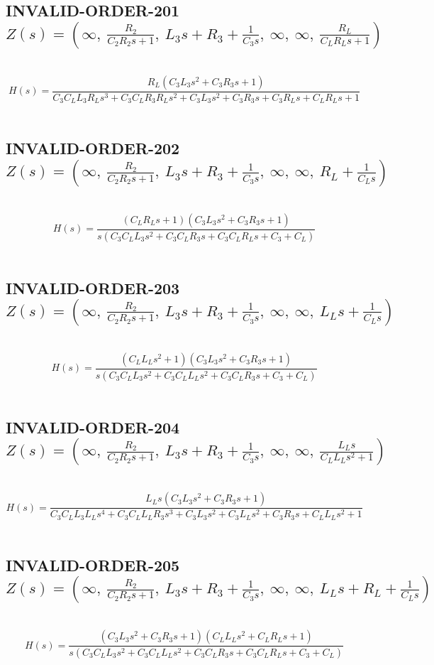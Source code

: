\documentclass{article}
\begin{document}
\subsection{INVALID-ORDER-201 $Z(s) = \left( \infty, \  \frac{R_{2}}{C_{2} R_{2} s + 1}, \  L_{3} s + R_{3} + \frac{1}{C_{3} s}, \  \infty, \  \infty, \  \frac{R_{L}}{C_{L} R_{L} s + 1}\right)$ } \ 
\textbf{\[H(s) = \frac{R_{L} \left(C_{3} L_{3} s^{2} + C_{3} R_{3} s + 1\right)}{C_{3} C_{L} L_{3} R_{L} s^{3} + C_{3} C_{L} R_{3} R_{L} s^{2} + C_{3} L_{3} s^{2} + C_{3} R_{3} s + C_{3} R_{L} s + C_{L} R_{L} s + 1}\] } \ 
\subsection{INVALID-ORDER-202 $Z(s) = \left( \infty, \  \frac{R_{2}}{C_{2} R_{2} s + 1}, \  L_{3} s + R_{3} + \frac{1}{C_{3} s}, \  \infty, \  \infty, \  R_{L} + \frac{1}{C_{L} s}\right)$ } \ 
\textbf{\[H(s) = \frac{\left(C_{L} R_{L} s + 1\right) \left(C_{3} L_{3} s^{2} + C_{3} R_{3} s + 1\right)}{s \left(C_{3} C_{L} L_{3} s^{2} + C_{3} C_{L} R_{3} s + C_{3} C_{L} R_{L} s + C_{3} + C_{L}\right)}\] } \ 
\subsection{INVALID-ORDER-203 $Z(s) = \left( \infty, \  \frac{R_{2}}{C_{2} R_{2} s + 1}, \  L_{3} s + R_{3} + \frac{1}{C_{3} s}, \  \infty, \  \infty, \  L_{L} s + \frac{1}{C_{L} s}\right)$ } \ 
\textbf{\[H(s) = \frac{\left(C_{L} L_{L} s^{2} + 1\right) \left(C_{3} L_{3} s^{2} + C_{3} R_{3} s + 1\right)}{s \left(C_{3} C_{L} L_{3} s^{2} + C_{3} C_{L} L_{L} s^{2} + C_{3} C_{L} R_{3} s + C_{3} + C_{L}\right)}\] } \ 
\subsection{INVALID-ORDER-204 $Z(s) = \left( \infty, \  \frac{R_{2}}{C_{2} R_{2} s + 1}, \  L_{3} s + R_{3} + \frac{1}{C_{3} s}, \  \infty, \  \infty, \  \frac{L_{L} s}{C_{L} L_{L} s^{2} + 1}\right)$ } \ 
\textbf{\[H(s) = \frac{L_{L} s \left(C_{3} L_{3} s^{2} + C_{3} R_{3} s + 1\right)}{C_{3} C_{L} L_{3} L_{L} s^{4} + C_{3} C_{L} L_{L} R_{3} s^{3} + C_{3} L_{3} s^{2} + C_{3} L_{L} s^{2} + C_{3} R_{3} s + C_{L} L_{L} s^{2} + 1}\] } \ 
\subsection{INVALID-ORDER-205 $Z(s) = \left( \infty, \  \frac{R_{2}}{C_{2} R_{2} s + 1}, \  L_{3} s + R_{3} + \frac{1}{C_{3} s}, \  \infty, \  \infty, \  L_{L} s + R_{L} + \frac{1}{C_{L} s}\right)$ } \ 
\textbf{\[H(s) = \frac{\left(C_{3} L_{3} s^{2} + C_{3} R_{3} s + 1\right) \left(C_{L} L_{L} s^{2} + C_{L} R_{L} s + 1\right)}{s \left(C_{3} C_{L} L_{3} s^{2} + C_{3} C_{L} L_{L} s^{2} + C_{3} C_{L} R_{3} s + C_{3} C_{L} R_{L} s + C_{3} + C_{L}\right)}\] } \ 
\end{document}
